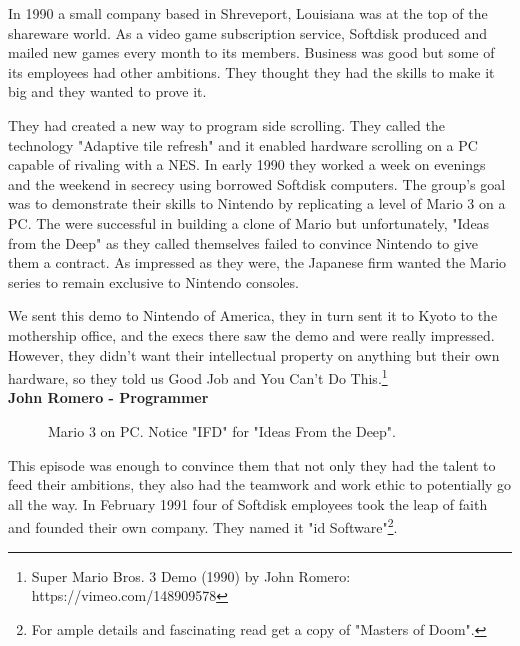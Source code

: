 \documentclass[book.tex]{subfiles}
\begin{document}
In 1990 a small company based in Shreveport, Louisiana was at the top of the shareware world. As a video game subscription service, Softdisk produced and mailed new games every month to its members. Business was good but some of its employees had other ambitions. They thought they had the skills to make it big and they wanted to prove it.\\
\par
They had created a new way to program side scrolling. They called the technology "Adaptive tile refresh" and it enabled hardware scrolling on a PC capable of rivaling with a NES. In early 1990 they worked a week on evenings and the weekend in secrecy using borrowed Softdisk computers. The group's goal was to demonstrate their skills to Nintendo by replicating a level of Mario 3 on a PC. The were successful in building a clone of Mario  but unfortunately, "Ideas from the Deep" as they called themselves failed to convince Nintendo to give them a contract. As impressed as they were, the Japanese firm wanted the Mario series to remain exclusive to Nintendo consoles.\\
\par
\begin{fancyquotes}
We sent this demo to Nintendo of America, they in turn sent it to Kyoto to the mothership office, and the execs there saw the demo and were really impressed. However, they didn't want their intellectual property on anything but their own hardware, so they told us Good Job and You Can't Do This.\footnote{Super Mario Bros. 3 Demo (1990) by John Romero: https://vimeo.com/148909578}
 \bigskip \\
\textbf{John Romero - Programmer}
 \end{fancyquotes}

 \begin{figure}[H]
\caption{Mario 3 on PC. Notice "IFD" for "Ideas From the Deep".}
\end{figure}

\par
This episode was enough to convince them that not only they had the talent to feed their ambitions, they also had the teamwork and work ethic to potentially go all the way. In February 1991 four of Softdisk employees took the leap of faith and founded their own company. They named it "id Software"\footnote{For ample details and fascinating read get a copy of "Masters of Doom".}. 
\end{document}
